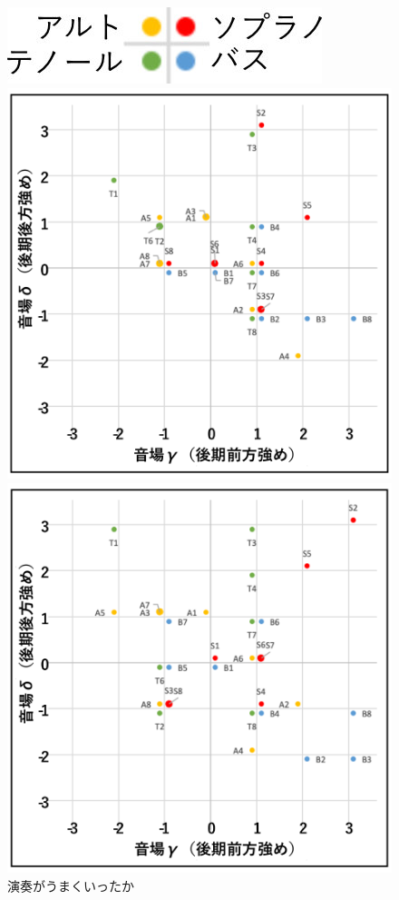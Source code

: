 \documentclass[11pt,a4j]{jreport}
\begin{document}
\begin{figure}[H]
  \begin{minipage}{1\linewidth}
    \centering
    \includegraphics[scale=.7]{images/subjectiveExp/scat_0_legend.jpg}
  \end{minipage}

  \begin{minipage}{0.5\linewidth}
    \centering
    \includegraphics[width=.9\linewidth]{images/subjectiveExp/scat_late_12wellDone.pdf}
    \caption*{演奏がうまくいったか}
  \end{minipage}%
  \begin{minipage}{0.5\linewidth}
    \centering
    \includegraphics[width=.9\linewidth]{images/subjectiveExp/scat_late_13easiness.pdf}

\end{minipage}
\end{figure}
\end{document}

